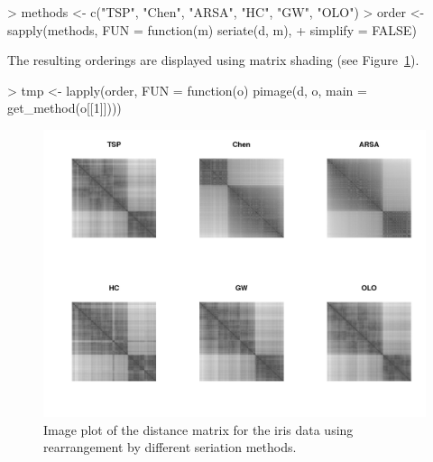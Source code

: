 \documentclass[fleqn, a4paper]{article}
\begin{document}
\begin{Schunk}
\begin{Sinput}
> methods <- c("TSP", "Chen", "ARSA", "HC", "GW", "OLO")
> order <- sapply(methods, FUN = function(m) seriate(d, m), 
+     simplify = FALSE)
\end{Sinput}
\end{Schunk}

The resulting orderings are displayed using matrix shading
(see Figure~\ref{fig:pimage3}).
\begin{Schunk}
\begin{Sinput}
> tmp <- lapply(order, FUN = function(o) pimage(d, o, main = get_method(o[[1]])))
\end{Sinput}
\end{Schunk}

\begin{figure}
    \centering
    \includegraphics[width=\linewidth]{seriation-pimage3}
    \caption{Image plot of the distance matrix for the iris data
    using rearrangement by different seriation methods.}
    \label{fig:pimage3}
\end{figure}
\end{document}
